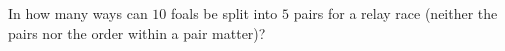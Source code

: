 In how many ways can $10$ foals be split into $5$ pairs for a relay race (neither the pairs nor the order within a pair matter)?
